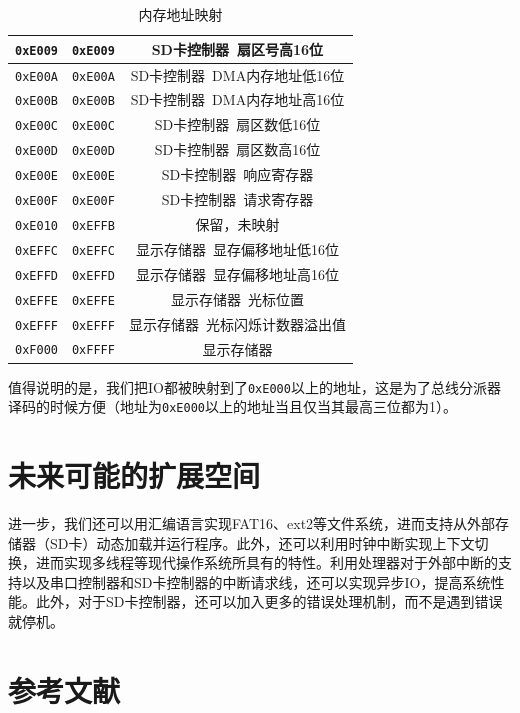 \documentclass[11pt,utf8]{report}
\begin{document}
\begin{table}[h]
\begin{tabular}{c|c|c}
\texttt{0xE009} & \texttt{0xE009} & SD卡控制器~扇区号高16位 \\ \hline
\texttt{0xE00A} & \texttt{0xE00A} & SD卡控制器~DMA内存地址低16位 \\ \hline
\texttt{0xE00B} & \texttt{0xE00B} & SD卡控制器~DMA内存地址高16位 \\ \hline
\texttt{0xE00C} & \texttt{0xE00C} & SD卡控制器~扇区数低16位 \\ \hline
\texttt{0xE00D} & \texttt{0xE00D} & SD卡控制器~扇区数高16位 \\ \hline
\texttt{0xE00E} & \texttt{0xE00E} & SD卡控制器~响应寄存器 \\ \hline
\texttt{0xE00F} & \texttt{0xE00F} & SD卡控制器~请求寄存器 \\ \hline
\texttt{0xE010} & \texttt{0xEFFB} & 保留，未映射 \\ \hline
\texttt{0xEFFC} & \texttt{0xEFFC} & 显示存储器~显存偏移地址低16位 \\ \hline
\texttt{0xEFFD} & \texttt{0xEFFD} & 显示存储器~显存偏移地址高16位 \\ \hline
\texttt{0xEFFE} & \texttt{0xEFFE} & 显示存储器~光标位置 \\ \hline
\texttt{0xEFFF} & \texttt{0xEFFF} & 显示存储器~光标闪烁计数器溢出值 \\ \hline
\texttt{0xF000} & \texttt{0xFFFF} & 显示存储器 \\
\bottomrule[1.2pt]
\end{tabular}
\caption{内存地址映射}
\label{mmap}
\end{table}

	\par 值得说明的是，我们把IO都被映射到了\texttt{0xE000}以上的地址，这是为了总线分派器译码的时候方便（地址为\texttt{0xE000}以上的地址当且仅当其最高三位都为1）。

\chapter{未来可能的扩展空间}
	\par 进一步，我们还可以用汇编语言实现FAT16、ext2等文件系统，进而支持从外部存储器（SD卡）动态加载并运行程序。此外，还可以利用时钟中断实现上下文切换，进而实现多线程等现代操作系统所具有的特性。利用处理器对于外部中断的支持以及串口控制器和SD卡控制器的中断请求线，还可以实现异步IO，提高系统性能。此外，对于SD卡控制器，还可以加入更多的错误处理机制，而不是遇到错误就停机。

\chapter{参考文献}
\end{document}
